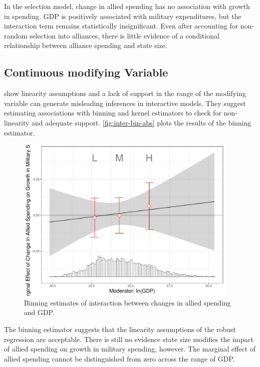 \documentclass[12pt]{article}
\begin{document}
In the selection model, change in allied spending has no association with growth in spending. 
GDP is positively associated with military expenditures, but the interaction term remains statistically insignificant. 
Even after accounting for non-random selection into alliances, there is little evidence of a conditional relationship between alliance spending and state size. 
 

\subsection{Continuous modifying Variable}


\citet{Hainmuelleretal2019} show linearity assumptions and a lack of support in the range of the modifying variable can generate misleading inferences in interactive models. 
They suggest estimating associations with binning and kernel estimators to check for non-linearity and adequate support. 
\autoref{fig:inter-bin-abs} plots the results of the binning estimator. 


\begin{figure}
	\centering
		\includegraphics[width=0.95\textwidth]{inter-bin-abs.pdf}
		\caption{Binning estimates of interaction between changes in allied spending and GDP.}
	\label{fig:inter-bin-abs}
\end{figure}


The binning estimator suggests that the linearity assumptions of the robust regression are acceptable. 
There is still no evidence state size modifies the impact of allied spending on growth in military spending, however. 
The marginal effect of allied spending cannot be distinguished from zero across the range of GDP. 
\end{document}

